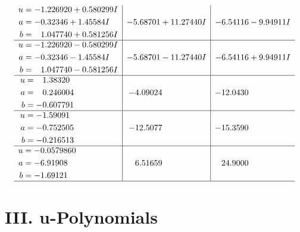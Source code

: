 \documentclass[1p]{elsarticle_modified}
\theoremstyle{definition}
\begin{document}
$$\begin{array}{c|c|c}
\begin{aligned}
u &= -1.226920 + 0.580299 I \\
a &= -0.32346 + 1.45584 I \\
b &= \phantom{-}1.047740 + 0.581256 I\end{aligned}
 & -5.68701 + 11.27440 I & -6.54116 - 9.94911 I \\ \hline\begin{aligned}
u &= -1.226920 - 0.580299 I \\
a &= -0.32346 - 1.45584 I \\
b &= \phantom{-}1.047740 - 0.581256 I\end{aligned}
 & -5.68701 - 11.27440 I & -6.54116 + 9.94911 I \\ \hline\begin{aligned}
u &= \phantom{-}1.38320\phantom{ +0.000000I} \\
a &= \phantom{-}0.246004\phantom{ +0.000000I} \\
b &= -0.607791\phantom{ +0.000000I}\end{aligned}
 & -4.09024\phantom{ +0.000000I} & -12.0430\phantom{ +0.000000I} \\ \hline\begin{aligned}
u &= -1.59091\phantom{ +0.000000I} \\
a &= -0.752505\phantom{ +0.000000I} \\
b &= -0.216513\phantom{ +0.000000I}\end{aligned}
 & -12.5077\phantom{ +0.000000I} & -15.3590\phantom{ +0.000000I} \\ \hline\begin{aligned}
u &= -0.0579860\phantom{ +0.000000I} \\
a &= -6.91908\phantom{ +0.000000I} \\
b &= -1.69121\phantom{ +0.000000I}\end{aligned}
 & \phantom{-}6.51659\phantom{ +0.000000I} & \phantom{-}24.9000\phantom{ +0.000000I}\\
 \hline 
 \end{array}$$\newpage
\newpage\renewcommand{\arraystretch}{1}
\centering \section*{ III. u-Polynomials}
\end{document}
